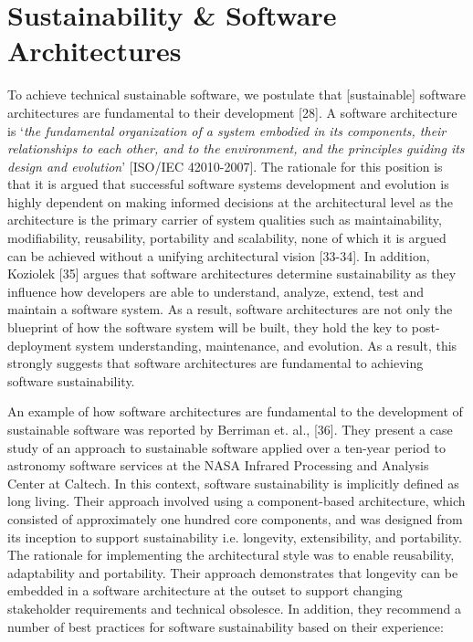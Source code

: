 \documentclass[preprint,12pt,authoryear]{elsarticle}
\begin{document}
\section{Sustainability \& Software Architectures}\label{sust+softarch}

To achieve technical sustainable software, we postulate that
[sustainable] software architectures are fundamental to their
development [28]. A software architecture is `{\emph{the fundamental
organization of a system embodied in its components, their
relationships to each other, and to the environment, and the
principles guiding its design and evolution}}' [ISO/IEC
42010-2007]. The rationale for this position is that it is argued that
successful software systems development and evolution is highly
dependent on making informed decisions at the architectural level as
the architecture is the primary carrier of system qualities such as
maintainability, modifiability, reusability, portability and
scalability, none of which it is argued can be achieved without a
unifying architectural vision [33-34]. In addition, Koziolek [35]
argues that software architectures determine sustainability as they
influence how developers are able to understand, analyze, extend, test
and maintain a software system. As a result, software architectures
are not only the blueprint of how the software system will be built,
they hold the key to post-deployment system understanding,
maintenance, and evolution. As a result, this strongly suggests that
software architectures are fundamental to achieving software
sustainability.

An example of how software architectures are fundamental to the
development of sustainable software was reported by Berriman et. al.,
[36]. They present a case study of an approach to sustainable software
applied over a ten-year period to astronomy software services at the
NASA Infrared Processing and Analysis Center at Caltech. In this context,
software sustainability is implicitly defined as long living. Their
approach involved using a component-based architecture, which
consisted of approximately one hundred core components, and was
designed from its inception to support sustainability i.e. longevity,
extensibility, and portability. The rationale for implementing the
architectural style was to enable reusability, adaptability and
portability. Their approach demonstrates that longevity can be
embedded in a software architecture at the outset to support changing
stakeholder requirements and technical obsolesce. In addition, they
recommend a number of best practices for software sustainability based
on their experience:
\end{document}
